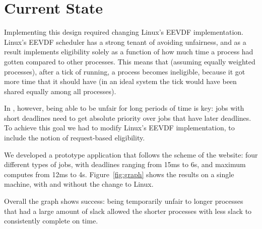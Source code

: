 \section{Current State}

Implementing this design required changing Linux's EEVDF implementation. Linux's
EEVDF scheduler has a strong tenant of avoiding unfairness, and as a result
implements eligibility solely as a function of how much time a process had
gotten compared to other processes. This means that (assuming equally weighted
processes), after a tick of running, a process becomes ineligible, because it
got more time that it should have (in an ideal system the tick would have been
shared equally among all processes).

In \sysname, however, being able to be unfair for long periods of time is key:
jobs with short deadlines need to get absolute priority over jobs that have
later deadlines. To achieve this goal we had to modify Linux's EEVDF
implementation, to include the notion of request-based eligibility.

We developed a prototype application that follows the scheme of the website:
four different types of jobs, with deadlines ranging from 15ms to 6s, and
maximum computes from 12ms to 4s. Figure~\ref{fig:graph} shows the results on a
single machine, with and without the change to Linux. 

Overall the graph shows success: being temporarily unfair to longer processes
that had a large amount of slack allowed the shorter processes with less slack
to consistently complete on time.